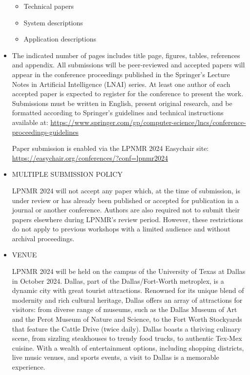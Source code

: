 \documentclass[prodmode,acmtecs]{acmsmall} %
\begin{document}
\begin{itemize}
\begin{itemize}\item  Technical papers
\item  System descriptions
\item  Application descriptions
\end{itemize} 
\item  The indicated number of pages includes title page, figures, tables, references and appendix. All submissions will be peer-reviewed and accepted papers will appear in the conference proceedings published in the Springer's Lecture Notes in Artificial Intelligence (LNAI) series. At least one author of each accepted paper is expected to register for the conference to present the work. Submissions must be written in English, present original research, and be formatted according to Springer's guidelines and technical instructions available at: \href{https://www.springer.com/gp/computer-science/lncs/conference-proceedings-guidelines}{https://www.springer.com/gp/computer-science/lncs/conference-proceedings-guidelines} 
 
  Paper submission is enabled via the LPNMR 2024 Easychair site: \href{https://easychair.org/conferences/?conf=lpnmr2024}{https://easychair.org/conferences/?conf=lpnmr2024} 
 
\item  MULTIPLE SUBMISSION POLICY 
 
  LPNMR 2024 will not accept any paper which, at the time of submission, is under review or has already been published or accepted for publication in a journal or another conference. Authors are also required not to submit their papers elsewhere during LPNMR's review period. However, these restrictions do not apply to previous workshops with a limited audience and without archival proceedings. 
 
\item  VENUE 
 
  LPNMR 2024 will be held on the campus of the University of Texas at Dallas in October 2024. Dallas, part of the Dallas/Fort-Worth metroplex, is a dynamic city with great tourist attractions. Renowned for its unique blend of modernity and rich cultural heritage, Dallas offers an array of attractions for visitors: from diverse range of museums, such as the Dallas Museum of Art and the Perot Museum of Nature and Science, to the Fort Worth Stockyards that feature the Cattle Drive (twice daily). Dallas boasts a thriving culinary scene, from sizzling steakhouses to trendy food trucks, to authentic Tex-Mex cuisine. With a wealth of entertainment options, including shopping districts, live music venues, and sports events, a visit to Dallas is a memorable experience. 
 

\end{itemize}
\end{document}
